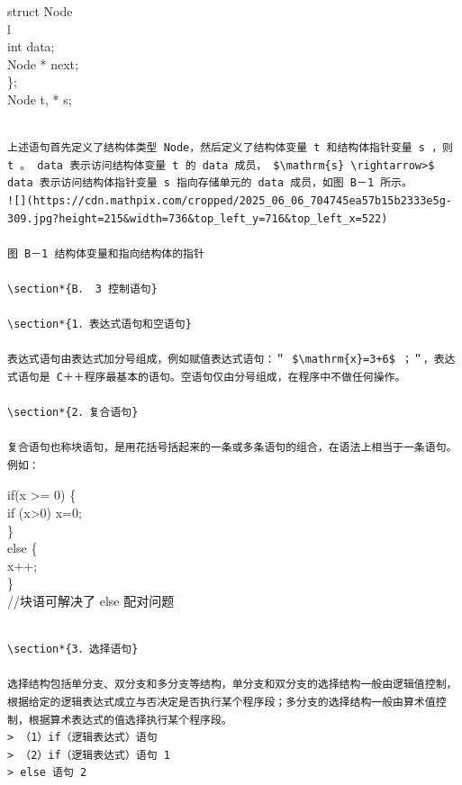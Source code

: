 \documentclass[10pt]{article}
\begin{document}
struct Node\\
l\\
int data;\\
Node * next;\\
\};\\
Node t, * s;

\begin{verbatim}

上述语句首先定义了结构体类型 Node，然后定义了结构体变量 t 和结构体指针变量 s ，则 t 。 data 表示访问结构体变量 t 的 data 成员， $\mathrm{s} \rightarrow>$ data 表示访问结构体指针变量 s 指向存储单元的 data 成员，如图 B－1 所示。
![](https://cdn.mathpix.com/cropped/2025_06_06_704745ea57b15b2333e5g-309.jpg?height=215&width=736&top_left_y=716&top_left_x=522)

图 B－1 结构体变量和指向结构体的指针

\section*{B． 3 控制语句}

\section*{1．表达式语句和空语句}

表达式语句由表达式加分号组成，例如赋值表达式语句：＂ $\mathrm{x}=3+6$ ；＂，表达式语句是 C＋＋程序最基本的语句。空语句仅由分号组成，在程序中不做任何操作。

\section*{2．复合语句}

复合语句也称块语句，是用花括号括起来的一条或多条语句的组合，在语法上相当于一条语句。例如：
\end{verbatim}

if(x >= 0) \{\\
if (x>0) x=0;\\
\}\\
else \{\\
x++;\\
\}\\
//块语可解决了 else 配对问题

\begin{verbatim}

\section*{3．选择语句}

选择结构包括单分支、双分支和多分支等结构，单分支和双分支的选择结构一般由逻辑值控制，根据给定的逻辑表达式成立与否决定是否执行某个程序段；多分支的选择结构一般由算术值控制，根据算术表达式的值选择执行某个程序段。
> （1）if（逻辑表达式）语句
> （2）if（逻辑表达式）语句 1
> else 语句 2
\end{verbatim}
\end{document}
